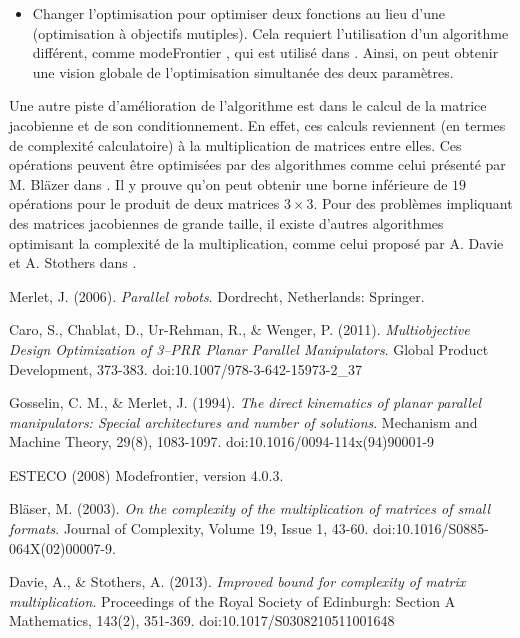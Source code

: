 \documentclass{article}
\begin{document}
\begin{multicols*}{2}
\begin{itemize}
    \item Changer l'optimisation pour optimiser deux fonctions au lieu d'une (optimisation à objectifs mutiples). Cela requiert l'utilisation d'un algorithme différent, comme modeFrontier \cite{modeFrontier}, qui est utilisé dans \cite{caro11}. Ainsi, on peut obtenir une vision globale de l'optimisation simultanée des deux paramètres.
\end{itemize}
\bigskip

Une autre piste d'amélioration de l'algorithme est dans le calcul de la matrice jacobienne et de son conditionnement. En effet, ces calculs reviennent (en termes de complexité calculatoire) à la multiplication de matrices entre elles. Ces opérations peuvent être optimisées par des algorithmes comme celui présenté par M. Bläzer dans \cite{blaser03}. Il y prouve qu'on peut obtenir une borne inférieure de $19$ opérations pour le produit de deux matrices $3 \times 3$. Pour des problèmes impliquant des matrices jacobiennes de grande taille, il existe d'autres algorithmes optimisant la complexité de la multiplication, comme celui proposé par A. Davie et A. Stothers dans \cite{davie13}.



\end{multicols*}

\begin{thebibliography}{9}

  Merlet, J. (2006). \textit{Parallel robots}. Dordrecht, Netherlands: Springer.  

  Caro, S., Chablat, D., Ur-Rehman, R., $\&$ Wenger, P. (2011). \textit{Multiobjective Design Optimization of 3–PRR Planar Parallel Manipulators}. Global Product Development, 373-383. doi:10.1007/978-3-642-15973-2\_37
  
  Gosselin, C. M., \& Merlet, J. (1994). \textit{The direct kinematics of planar parallel manipulators: Special architectures and number of solutions}. Mechanism and Machine Theory, 29(8), 1083-1097. doi:10.1016/0094-114x(94)90001-9
 
  ESTECO (2008) Modefrontier, version 4.0.3.

    Bläser, M. (2003). \textit{On the complexity of the multiplication of matrices of small formats}. Journal of Complexity, Volume 19, Issue 1, 43-60. doi:10.1016/S0885-064X(02)00007-9.

    Davie, A., \& Stothers, A. (2013). \textit{Improved bound for complexity of matrix multiplication}. Proceedings of the Royal Society of Edinburgh: Section A Mathematics, 143(2), 351-369. doi:10.1017/S0308210511001648
\end{thebibliography}
\end{document}

